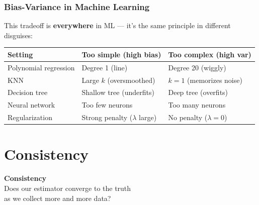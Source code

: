 \documentclass[aspectratio=169]{beamer}
\begin{document}
\begin{frame}
\frametitle{Bias-Variance in Machine Learning}

\small
This tradeoff is \textbf{everywhere} in ML --- it's the same principle in different disguises:

\vspace{0.1cm}
\begin{center}
\renewcommand{\arraystretch}{1.5}
\begin{tabular}{lll}
  \textbf{Setting} & \textbf{Too simple (high bias)} & \textbf{Too complex (high var)} \\
  \hline
  Polynomial regression & Degree 1 (line) & Degree 20 (wiggly) \\
  KNN & Large $k$ (oversmoothed) & $k=1$ (memorizes noise) \\
  Decision tree & Shallow tree (underfits) & Deep tree (overfits) \\
  Neural network & Too few neurons & Too many neurons \\
  Regularization & Strong penalty ($\lambda$ large) & No penalty ($\lambda = 0$) \\
  \hline
\end{tabular}
\end{center}

\vspace{0.1cm}
\begin{center}
\end{center}
\end{frame}

\section{Consistency}

\begin{frame}
\begin{center}
\vspace{1cm}
{\LARGE\bfseries\textcolor{popblue}{Consistency}}\\[15pt]
{\large Does our estimator converge to the truth}\\[4pt]
{\large as we collect more and more data?}
\end{center}
\end{frame}
\end{document}
